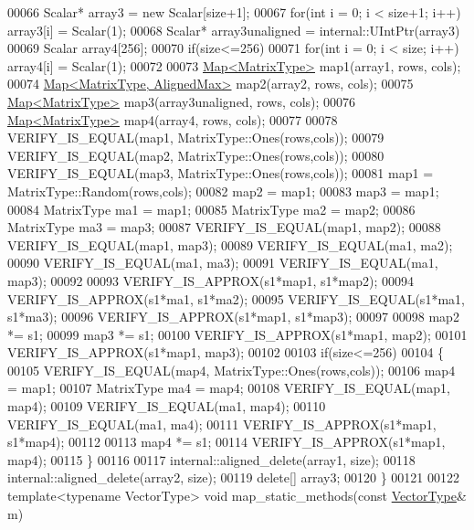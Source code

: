 \begin{DoxyCode}
00066   Scalar* array3 = \textcolor{keyword}{new} Scalar[size+1];
00067   \textcolor{keywordflow}{for}(\textcolor{keywordtype}{int} i = 0; i < size+1; i++) array3[i] = Scalar(1);
00068   Scalar* array3unaligned = internal::UIntPtr(array3)%
00069   Scalar array4[256];
00070   \textcolor{keywordflow}{if}(size<=256)
00071     \textcolor{keywordflow}{for}(\textcolor{keywordtype}{int} i = 0; i < size; i++) array4[i] = Scalar(1);
00072   
00073   \hyperlink{group___core___module_class_eigen_1_1_map}{Map<MatrixType>} map1(array1, rows, cols);
00074   \hyperlink{group___core___module_class_eigen_1_1_map}{Map<MatrixType, AlignedMax>} map2(array2, rows, cols);
00075   \hyperlink{group___core___module_class_eigen_1_1_map}{Map<MatrixType>} map3(array3unaligned, rows, cols);
00076   \hyperlink{group___core___module_class_eigen_1_1_map}{Map<MatrixType>} map4(array4, rows, cols);
00077   
00078   VERIFY\_IS\_EQUAL(map1, MatrixType::Ones(rows,cols));
00079   VERIFY\_IS\_EQUAL(map2, MatrixType::Ones(rows,cols));
00080   VERIFY\_IS\_EQUAL(map3, MatrixType::Ones(rows,cols));
00081   map1 = MatrixType::Random(rows,cols);
00082   map2 = map1;
00083   map3 = map1;
00084   MatrixType ma1 = map1;
00085   MatrixType ma2 = map2;
00086   MatrixType ma3 = map3;
00087   VERIFY\_IS\_EQUAL(map1, map2);
00088   VERIFY\_IS\_EQUAL(map1, map3);
00089   VERIFY\_IS\_EQUAL(ma1, ma2);
00090   VERIFY\_IS\_EQUAL(ma1, ma3);
00091   VERIFY\_IS\_EQUAL(ma1, map3);
00092   
00093   VERIFY\_IS\_APPROX(s1*map1, s1*map2);
00094   VERIFY\_IS\_APPROX(s1*ma1, s1*ma2);
00095   VERIFY\_IS\_EQUAL(s1*ma1, s1*ma3);
00096   VERIFY\_IS\_APPROX(s1*map1, s1*map3);
00097   
00098   map2 *= s1;
00099   map3 *= s1;
00100   VERIFY\_IS\_APPROX(s1*map1, map2);
00101   VERIFY\_IS\_APPROX(s1*map1, map3);
00102   
00103   \textcolor{keywordflow}{if}(size<=256)
00104   \{
00105     VERIFY\_IS\_EQUAL(map4, MatrixType::Ones(rows,cols));
00106     map4 = map1;
00107     MatrixType ma4 = map4;
00108     VERIFY\_IS\_EQUAL(map1, map4);
00109     VERIFY\_IS\_EQUAL(ma1, map4);
00110     VERIFY\_IS\_EQUAL(ma1, ma4);
00111     VERIFY\_IS\_APPROX(s1*map1, s1*map4);
00112     
00113     map4 *= s1;
00114     VERIFY\_IS\_APPROX(s1*map1, map4);
00115   \}
00116 
00117   internal::aligned\_delete(array1, size);
00118   internal::aligned\_delete(array2, size);
00119   \textcolor{keyword}{delete}[] array3;
00120 \}
00121 
00122 \textcolor{keyword}{template}<\textcolor{keyword}{typename} VectorType> \textcolor{keywordtype}{void} map\_static\_methods(\textcolor{keyword}{const} \hyperlink{struct_vector_type}{VectorType}& m)

\end{DoxyCode}
